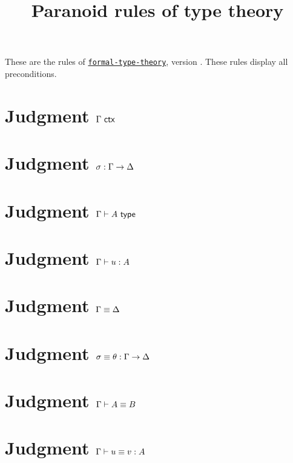 \documentclass{article}
\begin{document}
\title{Paranoid rules of type theory}
\author{}
\maketitle

These are the rules of
\href{https://github.com/TheoWinterhalter/formal-type-theory}{\texttt{formal-type-theory}},
version \texttt{}. These rules display all preconditions.

\section*{Judgment $\Gamma\ \mathsf{ctx}$}

\isctxRulesParanoid

\section*{Judgment $\sigma : \Gamma \to \Delta$}

\issubstRulesParanoid

\section*{Judgment $\Gamma \vdash A \ \mathsf{type}$}

\istypeRulesParanoid

\section*{Judgment $\Gamma \vdash u : A$}

\istermRulesParanoid

\section*{Judgment $\Gamma \equiv \Delta$}

\eqctxRulesParanoid

\section*{Judgment $\sigma \equiv \theta : \Gamma \to \Delta$}

\eqsubstRulesParanoid

\section*{Judgment $\Gamma \vdash A \equiv B$}

\eqtypeRulesParanoid

\section*{Judgment $\Gamma \vdash u \equiv v : A$}

\eqtermRulesParanoid
\end{document}
